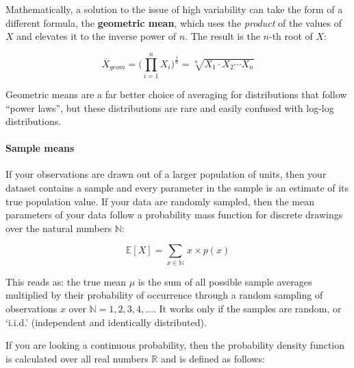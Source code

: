 Mathematically, a solution to the issue of high variability can take the form of a different formula, the \textbf{geometric mean}, which uses the \emph{product} of the values of $X$ and elevates it to the inverse power of $n$. The result is the $n$-th root of $X$:

$$\bar{X}_{geom}=\bigg(\prod_{i=1}^n X_i \bigg)^{\frac{1}{n}} = \sqrt[n]{X_1 \cdot X_2 \cdots X_n}$$

Geometric means are a far better choice of averaging for distributions that follow ``power laws'', but these distributions are rare and easily confused with log-log distributions.






\paragraph{Sample means}


If your observations are drawn out of a larger population of units, then your dataset contains a sample and every parameter in the sample is an estimate of its true population value. If your data are randomly sampled, then the mean parameters of your data follow a probability mass function for discrete drawings over the natural numbers $\mathbb{N}$:

$$\mathbb{E}[X] = \sum_{x \in \mathbb{N}} \, x \times p(x)$$

This reads as: the true mean $\mu$ is the sum of all possible sample averages multiplied by their probability of occurrence through a random sampling of observations $x$ over $\mathbb{N} = 1,2,3,4,\ldots$. It works only if the samples are random, or `i.i.d.' (independent and identically distributed).

If you are looking a continuous probability, then the probability density function is calculated over all real numbers $\mathbb{R}$ and is defined as follows:

